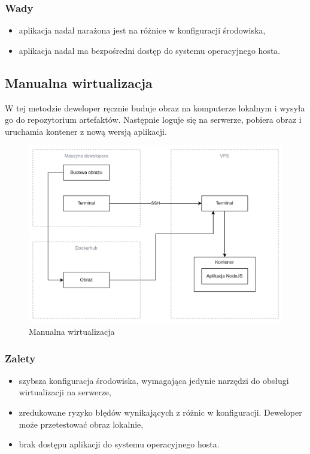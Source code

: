 \documentclass{article}
\begin{document}
\subsubsection{Wady}

\begin{itemize}
    \item aplikacja nadal narażona jest na różnice w konfiguracji środowiska,
    \item aplikacja nadal ma bezpośredni dostęp do systemu operacyjnego hosta.
\end{itemize}

\subsection{Manualna wirtualizacja}

W tej metodzie deweloper ręcznie buduje obraz na komputerze lokalnym i wysyła go do repozytorium artefaktów. Następnie loguje się na serwerze, pobiera obraz i uruchamia kontener z nową wersją aplikacji.

\begin{figure}[H]
    \centering
    \includegraphics[width=1\linewidth]{manualnaWirtualizacja.png}
    \caption{Manualna wirtualizacja}
    \label{fig:enter-label}
\end{figure}

\subsubsection{Zalety}

\begin{itemize}
    \item szybsza konfiguracja środowiska, wymagająca jedynie narzędzi do obsługi wirtualizacji na serwerze,
    \item zredukowane ryzyko błędów wynikających z różnic w konfiguracji. Deweloper może przetestować obraz lokalnie,
    \item brak dostępu aplikacji do systemu operacyjnego hosta.
\end{itemize}
\end{document}
